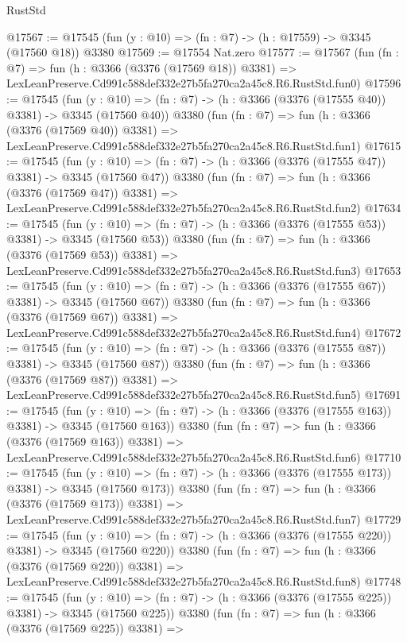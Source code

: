 \begin{lexlean}{RustStd}
\begin{coremodule}
@17567 := @17545 (fun (y : @10) => (fn : @7) -> (h : @17559) -> @3345 (@17560 @18)) @3380
@17569 := @17554 Nat.zero
@17577 := @17567
    (fun (fn : @7) =>
    fun (h : @3366 (@3376 (@17569 @18)) @3381) =>
    LexLeanPreserve.Cd991c588def332e27b5fa270ca2a45c8.R6.RustStd.fun0)
@17596 := @17545
    (fun (y : @10) => (fn : @7) -> (h : @3366 (@3376 (@17555 @40)) @3381) -> @3345 (@17560 @40))
    @3380
    (fun (fn : @7) =>
    fun (h : @3366 (@3376 (@17569 @40)) @3381) =>
    LexLeanPreserve.Cd991c588def332e27b5fa270ca2a45c8.R6.RustStd.fun1)
@17615 := @17545
    (fun (y : @10) => (fn : @7) -> (h : @3366 (@3376 (@17555 @47)) @3381) -> @3345 (@17560 @47))
    @3380
    (fun (fn : @7) =>
    fun (h : @3366 (@3376 (@17569 @47)) @3381) =>
    LexLeanPreserve.Cd991c588def332e27b5fa270ca2a45c8.R6.RustStd.fun2)
@17634 := @17545
    (fun (y : @10) => (fn : @7) -> (h : @3366 (@3376 (@17555 @53)) @3381) -> @3345 (@17560 @53))
    @3380
    (fun (fn : @7) =>
    fun (h : @3366 (@3376 (@17569 @53)) @3381) =>
    LexLeanPreserve.Cd991c588def332e27b5fa270ca2a45c8.R6.RustStd.fun3)
@17653 := @17545
    (fun (y : @10) => (fn : @7) -> (h : @3366 (@3376 (@17555 @67)) @3381) -> @3345 (@17560 @67))
    @3380
    (fun (fn : @7) =>
    fun (h : @3366 (@3376 (@17569 @67)) @3381) =>
    LexLeanPreserve.Cd991c588def332e27b5fa270ca2a45c8.R6.RustStd.fun4)
@17672 := @17545
    (fun (y : @10) => (fn : @7) -> (h : @3366 (@3376 (@17555 @87)) @3381) -> @3345 (@17560 @87))
    @3380
    (fun (fn : @7) =>
    fun (h : @3366 (@3376 (@17569 @87)) @3381) =>
    LexLeanPreserve.Cd991c588def332e27b5fa270ca2a45c8.R6.RustStd.fun5)
@17691 := @17545
    (fun (y : @10) => (fn : @7) -> (h : @3366 (@3376 (@17555 @163)) @3381) -> @3345 (@17560 @163))
    @3380
    (fun (fn : @7) =>
    fun (h : @3366 (@3376 (@17569 @163)) @3381) =>
    LexLeanPreserve.Cd991c588def332e27b5fa270ca2a45c8.R6.RustStd.fun6)
@17710 := @17545
    (fun (y : @10) => (fn : @7) -> (h : @3366 (@3376 (@17555 @173)) @3381) -> @3345 (@17560 @173))
    @3380
    (fun (fn : @7) =>
    fun (h : @3366 (@3376 (@17569 @173)) @3381) =>
    LexLeanPreserve.Cd991c588def332e27b5fa270ca2a45c8.R6.RustStd.fun7)
@17729 := @17545
    (fun (y : @10) => (fn : @7) -> (h : @3366 (@3376 (@17555 @220)) @3381) -> @3345 (@17560 @220))
    @3380
    (fun (fn : @7) =>
    fun (h : @3366 (@3376 (@17569 @220)) @3381) =>
    LexLeanPreserve.Cd991c588def332e27b5fa270ca2a45c8.R6.RustStd.fun8)
@17748 := @17545
    (fun (y : @10) => (fn : @7) -> (h : @3366 (@3376 (@17555 @225)) @3381) -> @3345 (@17560 @225))
    @3380
    (fun (fn : @7) =>
    fun (h : @3366 (@3376 (@17569 @225)) @3381) =>

\end{coremodule}
\end{lexlean}

